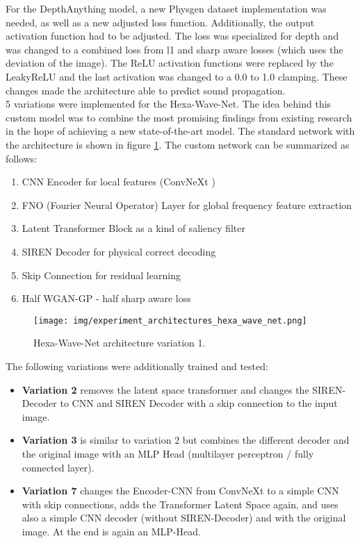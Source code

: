 		For the DepthAnything model, a new Physgen dataset implementation was needed, as well as a new adjusted loss function. Additionally, the output activation function had to be adjusted. The loss was specialized for depth and was changed to a combined loss from l1 and sharp aware losses (which uses the deviation of the image). The ReLU activation functions were replaced by the LeakyReLU and the last activation was changed to a 0.0 to 1.0 clamping. These changes made the architecture able to predict sound propagation.\\
		5 variations were implemented for the Hexa-Wave-Net. The idea behind this custom model was to combine the most promising findings from existing research in the hope of achieving a new state-of-the-art model. The standard network with the architecture is shown in figure \ref{fig:experiment_architecture_hexa_wave_net}. The custom network can be summarized as follows:
		\begin{enumerate}[itemsep=1mm, parsep=0pt]
			\item CNN Encoder for local features (ConvNeXt \cite{liu2022convnet2020s})
			\item FNO (Fourier Neural Operator) Layer for global frequency feature extraction
			\item Latent Transformer Block as a kind of saliency filter
			\item SIREN Decoder for physical correct decoding
			\item Skip Connection for residual learning
			\item Half WGAN-GP - half sharp aware loss
		\end{enumerate}
		
		\begin{figure}[H]
			\centering
			\texttt{[image: img/experiment\_architectures\_hexa\_wave\_net.png]}
			\caption[Hexa-Wave-Net architecture variation 1.]{Hexa-Wave-Net architecture variation 1.}
			\label{fig:experiment_architecture_hexa_wave_net}
		\end{figure}
		\FloatBarrier
		
		\clearpage
		The following variations were additionally trained and tested:
		\begin{itemize}[itemsep=1mm, parsep=0pt]
			\item \textbf{Variation 2} removes the latent space transformer and changes the SIREN-Decoder to CNN and SIREN Decoder with a skip connection to the input image.
			\item \textbf{Variation 3} is similar to variation 2 but combines the different decoder and the original image with an MLP Head (multilayer perceptron / fully connected layer).
			\item \textbf{Variation 7} changes the Encoder-CNN from ConvNeXt to a simple CNN with skip connections, adds the Transformer Latent Space again, and uses also a simple CNN decoder (without SIREN-Decoder) and with the original image. At the end is again an MLP-Head.
		\end{itemize}
		
